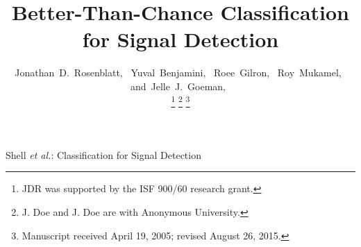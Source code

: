 \documentclass[journal]{IEEEtran}
\begin{document}
\title{Better-Than-Chance Classification for Signal Detection}
%
%
%

\author{Jonathan~D.~Rosenblatt,~
        Yuval~Benjamini,~
        Roee~Gilron,~
        Roy~Mukamel,~
        and~Jelle~J.~Goeman,~%

\thanks{JDR was supported by the ISF 900/60 research grant.}%
\thanks{J. Doe and J. Doe are with Anonymous University.}%
\thanks{Manuscript received April 19, 2005; revised August 26, 2015.}}

% 
%



%
{Shell \MakeLowercase{\textit{et al.}}: Classification for Signal Detection}
\end{document}
